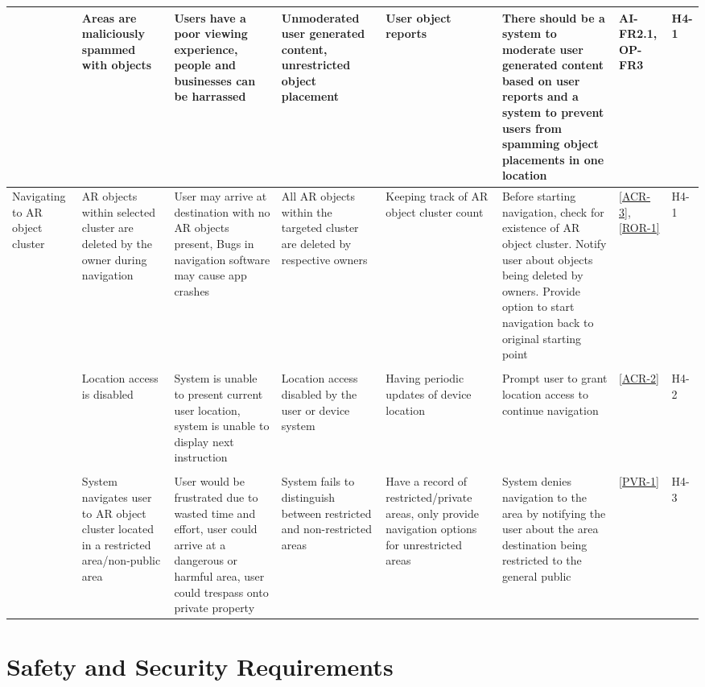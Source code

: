 \documentclass{article}
\begin{document}
\begin{landscape}
\begin{table}[hp]
\begin{footnotesize}
\begin{tabular}{|p{1in}|p{1in}|p{1.5in}|p{1.5in}|p{1.5in}|p{2in}|p{0.4in}|p{0.4in}|}
        & Areas are maliciously spammed with objects & Users have a poor viewing experience, people and businesses can be harrassed & Unmoderated user generated content, unrestricted object placement & User object reports & There should be a system to moderate user generated content based on user reports and a system to prevent users from spamming object placements in one location & AI-FR2.1, OP-FR3 & H4-1 \\
        \hline
        Navigating to AR object cluster & AR objects within selected cluster are deleted by the owner during navigation & User may arrive at destination with no AR objects present, Bugs in navigation software may cause app crashes & All AR objects within the targeted cluster are deleted by respective owners & Keeping track of AR object cluster count & Before starting navigation, check for existence of AR object cluster. Notify user about objects being deleted by owners. Provide option to start navigation back to original starting point & \ref{ACR-3}, \ref{ROR-1} & H4-1 \\
        & & & & & & & \\
        & Location access is disabled & System is unable to present current user location, system is unable to display next instruction & Location access disabled by the user or device system & Having periodic updates of device location & Prompt user to grant location access to continue navigation & \ref{ACR-2} & H4-2 \\
        & & & & & & & \\
        & System navigates user to AR object cluster located in a restricted area/non-public area & User would be frustrated due to wasted time and effort, user could arrive at a dangerous or harmful area, user could trespass onto private property & System fails to distinguish between restricted and non-restricted areas & Have a record of restricted/private areas, only provide navigation options for unrestricted areas & System denies navigation to the area by notifying the user about the area destination being restricted to the general public & \ref{PVR-1} & H4-3 \\
        \hline
    \end{tabular}
    \end{footnotesize}
\end{table}
\end{landscape}
\restoregeometry

\pagebreak

\section{Safety and Security Requirements}
\end{document}
